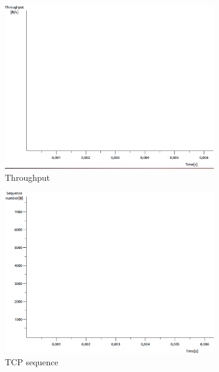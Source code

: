 \documentclass[conference,a4paper]{IEEEtran}
\begin{document}
\begin{figure}
 \centering
 \begin{subfigure}[b]{0.2\textwidth}
  \includegraphics[width=\textwidth]{s2-3_thru}
  \caption{Throughput}
 \end{subfigure}
 \begin{subfigure}[b]{0.2\textwidth}
  \includegraphics[width=\textwidth]{s2-3_seq}
  \caption{TCP sequence}
 \end{subfigure}
 \begin{subfigure}[b]{0.2\textwidth}

\end{subfigure}
\end{figure}
\end{document}
